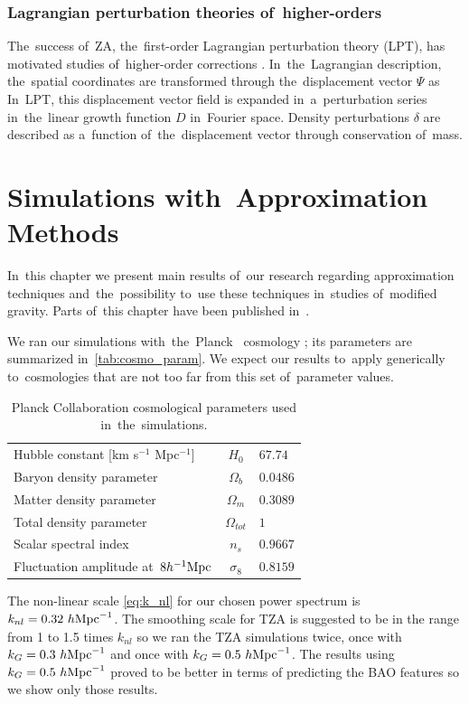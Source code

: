 \subsection{Lagrangian perturbation theories of~higher-orders}
The~success of~ZA, the~first-order Lagrangian perturbation theory (LPT), has motivated studies of~higher-order corrections \parencite[see e.g.][]{10.1093/mnras/264.2.375,2002PhR...367....1B,2010MNRAS.403.1859J,2014ApJ...788...63S}. In~the~Lagrangian description, the~spatial coordinates are transformed through the~displacement vector $\Psi$ as
In~LPT, this displacement vector field is expanded in~a~perturbation series in~the~linear growth function $D$ in~Fourier space. Density perturbations $\delta$ are described as a~function of~the~displacement vector through conservation of~mass.\DIFdelbegin {}\DIFdelend \clearpage{}
\clearpage{}\chapter{Simulations with~Approximation Methods}
\label{chpt:app_sims}
In~this chapter we present main results of~our research regarding approximation techniques and~the~possibility to~use these techniques in~studies of~modified gravity. Parts of~this chapter have been published in~\textcite{2020MNRAS.493.2085V}.

We ran our simulations with~the~Planck \LCDM\ cosmology \parencite{planck_cosm}; its parameters are summarized in~\autoref{tab:cosmo_param}. We expect our results to~apply generically to~cosmologies that are not too far from this set of~parameter values.
\begin{table}[!b]
\centering
\begin{tabular}{ l c l }
  \hline \hline
  Hubble constant  [km s$^{-1}$ Mpc$^{-1}$] & $H_0$ & $67.74$ \\
  Baryon density parameter & $\Omega_b$ & $0.0486$ \\
  Matter density parameter & $\Omega_m$ & $0.3089$ \\
  Total density parameter & $\Omega_{tot}$ & $1$ \\
  Scalar spectral index & $n_s$ & $0.9667$ \\
  Fluctuation amplitude at~$8h^{-1}\text{Mpc}$ & $\sigma_8$ & $0.8159$ \\
  \hline \hline
\end{tabular}
\caption{Planck Collaboration cosmological parameters \parencite{planck_cosm} used in~the~simulations.}
\label{tab:cosmo_param}
\end{table}
The non-linear scale \eqref{eq:k_nl} for our chosen power spectrum is $k_{nl}=0.32~h\text{Mpc}^{-1}$. The smoothing scale for TZA is suggested to be in the range from 1 to 1.5 times $k_{nl}$ so we ran the TZA simulations twice, once with $k_G=0.3~h\text{Mpc}^{-1}$ and once with $k_G=0.5~h\text{Mpc}^{-1}$. The results using $k_G=0.5~h\text{Mpc}^{-1}$ proved to be better in terms of predicting the BAO features so we show only those results.

